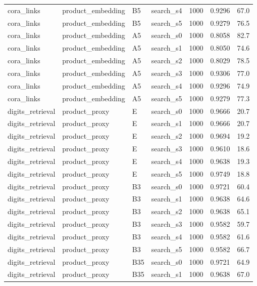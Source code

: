 \begin{longtable}{llllrrr}
\rowcolor{oursbg}
cora\_links & product\_embedding & B5 & search\_s4 & 1000 & 0.9296 & 67.0 \\
\rowcolor{oursbg}
cora\_links & product\_embedding & B5 & search\_s5 & 1000 & 0.9279 & 76.5 \\
cora\_links & product\_embedding & A5 & search\_s0 & 1000 & 0.8058 & 82.7 \\
cora\_links & product\_embedding & A5 & search\_s1 & 1000 & 0.8050 & 74.6 \\
cora\_links & product\_embedding & A5 & search\_s2 & 1000 & 0.8029 & 78.5 \\
cora\_links & product\_embedding & A5 & search\_s3 & 1000 & 0.9306 & 77.0 \\
cora\_links & product\_embedding & A5 & search\_s4 & 1000 & 0.9296 & 74.9 \\
cora\_links & product\_embedding & A5 & search\_s5 & 1000 & 0.9279 & 77.3 \\
digits\_retrieval & product\_proxy & E & search\_s0 & 1000 & 0.9666 & 20.7 \\
digits\_retrieval & product\_proxy & E & search\_s1 & 1000 & 0.9666 & 20.7 \\
digits\_retrieval & product\_proxy & E & search\_s2 & 1000 & 0.9694 & 19.2 \\
digits\_retrieval & product\_proxy & E & search\_s3 & 1000 & 0.9610 & 18.6 \\
digits\_retrieval & product\_proxy & E & search\_s4 & 1000 & 0.9638 & 19.3 \\
digits\_retrieval & product\_proxy & E & search\_s5 & 1000 & 0.9749 & 18.8 \\
digits\_retrieval & product\_proxy & B3 & search\_s0 & 1000 & 0.9721 & 60.4 \\
digits\_retrieval & product\_proxy & B3 & search\_s1 & 1000 & 0.9638 & 64.6 \\
digits\_retrieval & product\_proxy & B3 & search\_s2 & 1000 & 0.9638 & 65.1 \\
digits\_retrieval & product\_proxy & B3 & search\_s3 & 1000 & 0.9582 & 59.7 \\
digits\_retrieval & product\_proxy & B3 & search\_s4 & 1000 & 0.9582 & 61.6 \\
digits\_retrieval & product\_proxy & B3 & search\_s5 & 1000 & 0.9582 & 66.7 \\
digits\_retrieval & product\_proxy & B35 & search\_s0 & 1000 & 0.9721 & 64.9 \\
digits\_retrieval & product\_proxy & B35 & search\_s1 & 1000 & 0.9638 & 67.0 \\

\end{longtable}
